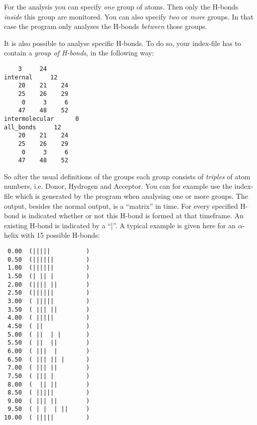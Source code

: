 For the analysis you can specify {\em one} group of atoms. Then only the 
H-bonds {\em inside} this group are monitored. You can also specify {\em two} 
or {\em more} groups. In that case the program only analyses the H-bonds 
{\em between} those groups. 

It is also possible to analyse specific H-bonds. To do so, your index-file has 
to contain a {\em group of H-bonds}, in the following way:
\begin{verbatim}
    3     24
internal     12 
    20    21    24
    25    26    29
     0     3     6
    47    48    52
intermolecular      0 
all_bonds     12 
    20    21    24
    25    26    29
     0     3     6
    47    48    52
\end{verbatim}
So after the usual definitions of the groups each group consists of 
{\em triples} of atom numbers, i.e. Donor, Hydrogen and Acceptor. 
You can for example use the index-file which is generated by the program when 
analysing one or more groups. The output, besides the normal output, is a 
``matrix'' in time. For every specified H-bond is indicated whether or not 
this H-bond is formed at that timeframe. An existing H-bond is indicated by 
a ``|''. A typical example is given here for an $\alpha$-helix with 15 
possible H-bonds:
{\small 
\begin{verbatim} 
 0.00  (|||||          )
 0.50  (||||||         )
 1.00  (||||||         )
 1.50  (| || |         )
 2.00  (|||| ||        )
 2.50  (||||||         )
 3.00  ( |||||         )
 3.50  ( ||| ||        )
 4.00  ( |||||         )
 4.50  ( ||            )
 5.00  ( ||  | |       )
 5.50  ( ||  ||        )
 6.00  ( |||  |        )
 6.50  ( ||| || |      )
 7.00  ( ||| ||        )
 7.50  ( ||| |         )
 8.00  (  || ||        )
 8.50  ( |||||         )
 9.00  ( ||| ||        )
 9.50  ( | |  | ||     )
10.00  ( |||||         )
\end{verbatim} }


